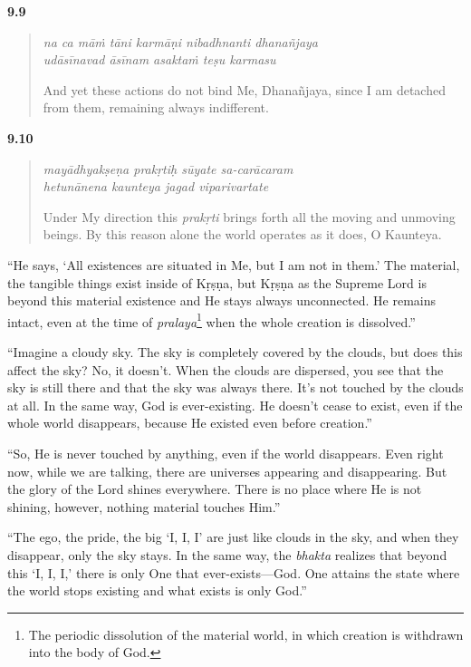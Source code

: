 \par\noindent\textbf{9.9}\par
\begin{verse}
\textit{na ca māṁ tāni karmāṇi nibadhnanti dhanañjaya} \\
\textit{udāsīnavad āsīnam asaktaṁ teṣu karmasu}

\noindent And yet these actions do not bind Me, Dhanañjaya, since I am detached from them, remaining always indifferent.
\end{verse}
\par



\par\noindent\textbf{9.10}\par
\begin{verse}
\textit{mayādhyakṣeṇa prakṛtiḥ sūyate sa-carācaram} \\
\textit{hetunānena kaunteya jagad viparivartate}

\noindent Under My direction this \textit{prakṛti} brings forth all the moving and unmoving beings. By this reason alone the world operates as it does, O Kaunteya.
\end{verse}
\par


\enquote{He says, \enquote{All existences are situated in Me, but I am not in them.} The material, the tangible things exist inside of Kṛṣṇa, but Kṛṣṇa as the Supreme Lord is beyond this material existence and He stays always unconnected. He remains intact, even at the time of \textit{pralaya}\footnote{The periodic dissolution of the material world, in which creation is withdrawn into the body of God.} when the whole creation is dissolved.}

\enquote{Imagine a cloudy sky. The sky is completely covered by the clouds, but does this affect the sky? No, it doesn’t. When the clouds are dispersed, you see that the sky is still there and that the sky was always there. It’s not touched by the clouds at all. In the same way, God is ever-existing. He doesn’t cease to exist, even if the whole world disappears, because He existed even before creation.}

\enquote{So, He is never touched by anything, even if the world disappears. Even right now, while we are talking, there are universes appearing and disappearing. But the glory of the Lord shines everywhere. There is no place where He is not shining, however, nothing material touches Him.}

\enquote{The ego, the pride, the big \enquote{I, I, I} are just like clouds in the sky, and when they disappear, only the sky stays. In the same way, the \textit{bhakta} realizes that beyond this \enquote{I, I, I,} there is only One that ever-exists---God. One attains the state where the world stops existing and what exists is only God.}

